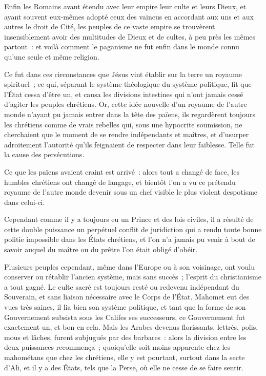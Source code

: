 \documentclass[french,twoside]{book} %
\begin{document}
Enfin les Romains avant étendu avec leur empire leur culte et leurs Dieux, et ayant souvent eux-mêmes adopté ceux des vaincus en accordant aux uns et aux autres le droit de Cité, les peuples de ce vaste empire se trouvèrent insensiblement avoir des multitudes de Dieux et de cultes, à peu près les mêmes partout : et voilà comment le paganisme ne fut enfin dans le monde connu qu’une seule et même religion.\par
Ce fut dans ces circonstances que Jésus vint établir sur la terre un royaume spirituel ; ce qui, séparant le système théologique du système politique, fit que l’État cessa d’être un, et causa les divisions intestines qui n’ont jamais cessé d’agiter les peuples chrétiens. Or, cette idée nouvelle d’un royaume de l’autre monde n’ayant pu jamais entrer dans la tête des païens, ils regardèrent toujours les chrétiens comme de vrais rebelles qui, sous une hypocrite soumission, ne cherchaient que le moment de se rendre indépendants et maîtres, et d’usurper adroitement l’autorité qu’ils feignaient de respecter dans leur faiblesse. Telle fut la cause des persécutions.\par
Ce que les païens avaient craint est arrivé : alors tout a changé de face, les humbles chrétiens ont changé de langage, et bientôt l’on a vu ce prétendu royaume de l’autre monde devenir sous un chef visible le plus violent despotisme dans celui-ci.\par
Cependant comme il y a toujours eu un Prince et des lois civiles, il a résulté de cette double puissance un perpétuel conflit de juridiction qui a rendu toute bonne politie impossible dans les États chrétiens, et l’on n’a jamais pu venir à bout de savoir auquel du maître ou du prêtre l’on était obligé d’obéir.\par
Plusieurs peuples cependant, même dans l’Europe ou à son voisinage, ont voulu conserver ou rétablir l’ancien système, mais sans succès ; l’esprit du christianisme a tout gagné. Le culte sacré est toujours resté ou redevenu indépendant du Souverain, et sans liaison nécessaire avec le Corps de l’État. Mahomet eut des vues très saines, il lia bien son système politique, et tant que la forme de son Gouvernement subsista sous les Califes ses successeurs, ce Gouvernement fut exactement un, et bon en cela. Mais les Arabes devenus florissants, lettrés, polis, mous et lâches, furent subjugués par des barbares : alors la division entre les deux puissances recommença ; quoiqu’elle soit moins apparente chez les mahométans que chez les chrétiens, elle y est pourtant, surtout dans la secte d’Ali, et il y a des États, tels que la Perse, où elle ne cesse de se faire sentir.\par
\end{document}
